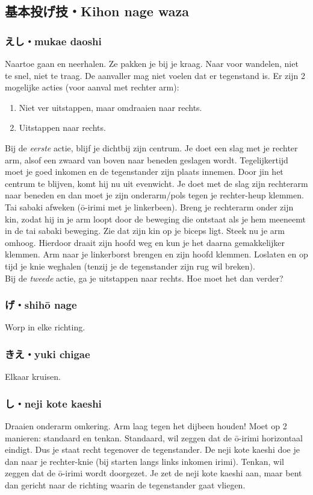 \subsection{基本投げ技・Kihon nage waza}
\subsubsection{えし・mukae daoshi}
Naartoe gaan en neerhalen. Ze pakken je bij je kraag. Naar voor wandelen, niet te snel, niet te traag. De aanvaller mag niet voelen dat er tegenstand is. Er zijn 2 mogelijke acties (voor aanval met rechter arm):\\
\begin{enumerate}
    \item{Niet ver uitstappen, maar omdraaien naar rechts.}
    \item{Uitstappen naar rechts.}
\end{enumerate}
Bij de \textit{eerste} actie, blijf je dichtbij zijn centrum. Je doet een slag met je rechter arm, alsof een zwaard van boven naar beneden geslagen wordt. Tegelijkertijd moet je goed inkomen en de tegenstander zijn plaats innemen. Door jin het centrum te blijven, komt hij nu uit evenwicht. Je doet met de slag zijn rechterarm naar beneden en dan moet je zijn onderarm/pols tegen je rechter-heup klemmen. Tai sabaki afweken (\={o}-irimi met je linkerbeen). Breng je rechterarm onder zijn kin, zodat hij in je arm loopt door de beweging die ontstaat als je hem meeneemt in de tai sabaki beweging. Zie dat zijn kin op je biceps ligt. Steek nu je arm omhoog. Hierdoor draait zijn hoofd weg en kun je het daarna gemakkelijker klemmen. Arm naar je linkerborst brengen en zijn hoofd klemmen. Loslaten en op tijd je knie weghalen (tenzij je de tegenstander zijn rug wil breken).\\
Bij de \textit{tweede} actie, ga je uitstappen naar rechts. Hoe moet het dan verder?


\subsubsection{げ・shih\={o} nage}
Worp in elke richting.

\subsubsection{きえ・yuki chigae}
Elkaar kruisen.

\subsubsection{し・neji kote kaeshi}
Draaien onderarm omkering.
Arm laag tegen het dijbeen houden!
Moet op 2 manieren: standaard en tenkan.
Standaard, wil zeggen dat de \={o}-irimi horizontaal eindigt. Dus je staat recht tegenover de tegenstander. De neji kote kaeshi doe je dan naar je rechter-knie (bij starten langs links inkomen irimi). 
Tenkan, wil zeggen dat de \={o}-irimi wordt doorgezet. Je zet de neji kote kaeshi aan, maar bent dan gericht naar de richting waarin de tegenstander gaat vliegen.

